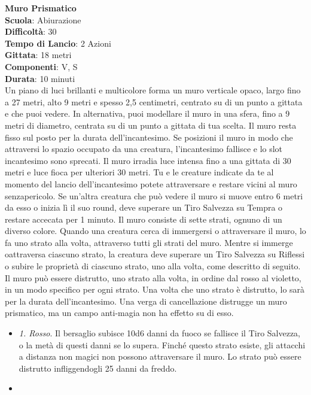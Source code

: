 \begin{multicols}{2}
\medskip\textbf{Muro Prismatico}\\
\textbf{Scuola}: Abiurazione\\
\textbf{Difficoltà}:  30\\
\textbf{Tempo di Lancio}: 2 Azioni\\
\textbf{Gittata}: 18 metri\\
\textbf{Componenti}: V, S\\
\textbf{Durata}: 10 minuti\\
Un piano di luci brillanti e multicolore forma un muro verticale opaco, largo fino a 27 metri, alto 9 metri e spesso 2,5 centimetri, centrato su di un punto a gittata e che puoi vedere. In alternativa, puoi modellare il muro in una sfera, fino a 9 metri di diametro, centrata su di un punto a gittata di tua scelta. Il muro resta fisso sul posto per la durata dell'incantesimo. Se posizioni il muro in modo che attraversi lo spazio occupato da una creatura, l'incantesimo fallisce e lo slot incantesimo sono sprecati. Il muro irradia luce intensa fino a una gittata di 30 metri e luce fioca per ulteriori 30 metri. Tu e le creature indicate da te al momento del lancio dell'incantesimo potete attraversare e restare vicini al muro senzapericolo. Se un'altra  creatura che può vedere il muro si muove entro 6 metri da esso o inizia lì il suo round, deve superare un Tiro Salvezza su Tempra o restare accecata per 1 minuto. Il muro consiste di sette strati, ognuno di un diverso colore. Quando una creatura cerca di immergersi o attraversare il muro, lo fa uno strato alla volta, attraverso tutti gli strati del muro. Mentre si immerge oattraversa  ciascuno strato, la creatura deve superare un Tiro Salvezza su Riflessi o subire le proprietà di ciascuno strato, uno alla volta, come descritto di seguito.\\
Il muro può essere distrutto, uno strato alla volta, in ordine dal rosso al violetto, in un modo specifico per ogni strato. Una volta che uno strato è distrutto, lo sarà per la durata dell'incantesimo. Una verga di cancellazione distrugge un muro prismatico, ma un campo anti-magia non ha effetto su di esso.
\medskip
\begin{itemize}
\item
\textit{1. Rosso}. Il bersaglio subisce 10d6 danni da fuoco se fallisce il Tiro Salvezza, o la metà di questi danni se lo supera. Finché questo strato esiste, gli attacchi a distanza non magici non possono attraversare il muro.  Lo strato può essere distrutto infliggendogli 25 danni da freddo.
\item

\end{itemize}
\end{multicols}
